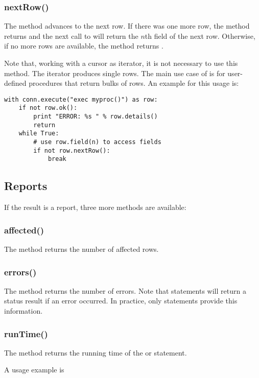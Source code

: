 \subsubsection{nextRow()}
The method advances to the next row.
If there was one more row, the method
returns  and the next call
to  will return the
$n$th field of the next row.
Otherwise, if no more rows are available,
the method returns .

Note that, working with a cursor
as iterator, it is not necessary
to use this method. The iterator
produces single rows.
The main use case of 
is for user-defined procedures that
return bulks of rows. An example
for this usage is:

\begin{python}
\begin{lstlisting}
with conn.execute("exec myproc()") as row:
    if not row.ok():
        print "ERROR: %s " % row.details()
        return
    while True:
        # use row.field(n) to access fields
        if not row.nextRow():
            break
\end{lstlisting}
\end{python}

\subsection{Reports}
If the result is a report,
three more methods are available:

\subsubsection{affected()}
The method returns the number of affected rows.

\subsubsection{errors()}
The method returns the number of errors.
Note that  statements will
return a status result if an error occurred.
In practice, only  statements provide
this information.

\subsubsection{runTime()}
The method returns the running time of 
the  or  statement.

A usage example is

